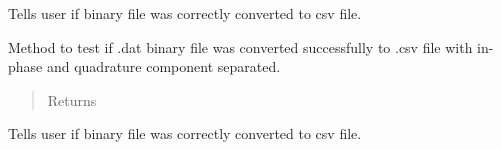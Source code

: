 \documentclass[letterpaper,10pt,english]{sphinxmanual}
\begin{document}
\begin{fulllineitems}
\begin{fulllineitems}
\begin{quote}
\begin{description}
\end{description}\end{quote}

Tells user if binary file was correctly converted to csv file.

\end{fulllineitems}


\begin{fulllineitems}
\label{\detokenize{Test:test.TestParser.test_raw}}
Method to test if .dat binary file was converted successfully to .csv file with in-phase and quadrature
component separated.
\begin{quote}\begin{description}
\item[{Returns}] \leavevmode


\end{description}\end{quote}

Tells user if binary file was correctly converted to csv file.

\end{fulllineitems}


\end{fulllineitems}







\renewcommand{\indexname}{Python Module Index}
\begin{sphinxtheindex}
\let\bigletter\sphinxstyleindexlettergroup
\bigletter{t}
\item\relax{}
\item\relax{}
\indexspace
\bigletter{x}
\item\relax{}
\end{sphinxtheindex}

\renewcommand{\indexname}{Index}
\printindex
\end{document}
